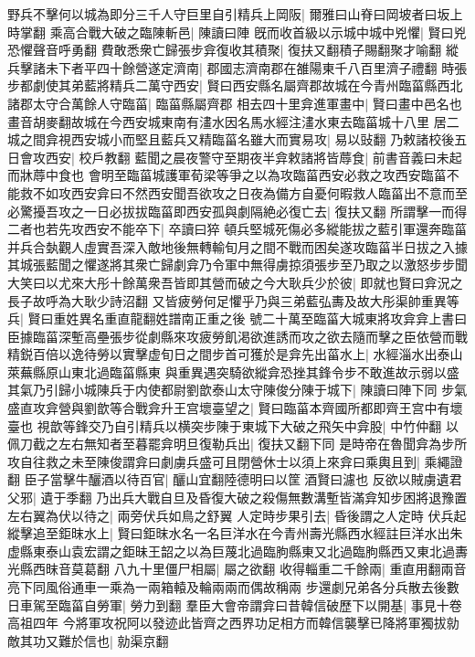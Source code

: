 野兵不擊何以城為即分三千人守巨里自引精兵上岡阪|{
	爾雅曰山脊曰岡坡者曰坂上時掌翻}
乘高合戰大破之臨陳斬邑|{
	陳讀曰陣}
旣而收首級以示城中城中兇懼|{
	賢曰兇恐懼聲音呼勇翻}
費敢悉衆亡歸張步弇復收其積聚|{
	復扶又翻積子賜翻聚才喻翻}
縱兵擊諸未下者平四十餘營遂定濟南|{
	郡國志濟南郡在雒陽東千八百里濟子禮翻}
時張步都劇使其弟藍將精兵二萬守西安|{
	賢曰西安縣名屬齊郡故城在今青州臨菑縣西北}
諸郡太守合萬餘人守臨菑|{
	臨菑縣屬齊郡}
相去四十里弇進軍畫中|{
	賢曰畫中邑名也畫音胡麥翻故城在今西安城東南有澅水因名馬水經注澅水東去臨菑城十八里}
居二城之間弇視西安城小而堅且藍兵又精臨菑名雖大而實易攻|{
	易以䜴翻}
乃敕諸校後五日會攻西安|{
	校戶教翻}
藍聞之晨夜警守至期夜半弇敕諸將皆蓐食|{
	前書音義曰未起而牀蓐中食也}
會明至臨菑城護軍荀梁等爭之以為攻臨菑西安必救之攻西安臨菑不能救不如攻西安弇曰不然西安聞吾欲攻之日夜為備方自憂何暇救人臨菑出不意而至必驚擾吾攻之一日必拔拔臨菑即西安孤與劇隔絶必復亡去|{
	復扶又翻}
所謂擊一而得二者也若先攻西安不能卒下|{
	卒讀曰猝}
頓兵堅城死傷必多縱能拔之藍引軍還奔臨菑并兵合埶觀人虛實吾深入敵地後無轉輸旬月之間不戰而困矣遂攻臨菑半日拔之入據其城張藍聞之懼遂將其衆亡歸劇弇乃令軍中無得虜掠須張步至乃取之以激怒步步聞大笑曰以尤來大彤十餘萬衆吾皆即其營而破之今大耿兵少於彼|{
	即就也賢曰弇況之長子故呼為大耿少詩沼翻}
又皆疲勞何足懼乎乃與三弟藍弘夀及故大彤渠帥重異等兵|{
	賢曰重姓異名重直龍翻姓譜南正重之後}
號二十萬至臨菑大城東將攻弇弇上書曰臣據臨菑深塹高壘張步從劇縣來攻疲勞飢渇欲進誘而攻之欲去隨而擊之臣依營而戰精鋭百倍以逸待勞以實擊虚旬日之間步首可獲於是弇先出菑水上|{
	水經淄水出泰山萊蕪縣原山東北過臨菑縣東}
與重異遇突騎欲縱弇恐挫其鋒令步不敢進故示弱以盛其氣乃引歸小城陳兵于内使都尉劉歆泰山太守陳俊分陳于城下|{
	陳讀曰陣下同}
步氣盛直攻弇營與劉歆等合戰弇升王宫壞臺望之|{
	賢曰臨菑本齊國所都即齊王宫中有壞臺也}
視歆等鋒交乃自引精兵以横突步陳于東城下大破之飛矢中弇股|{
	中竹仲翻}
以佩刀截之左右無知者至暮罷弇明旦復勒兵出|{
	復扶又翻下同}
是時帝在魯聞弇為步所攻自往救之未至陳俊謂弇曰劇虜兵盛可且閉營休士以須上來弇曰乘輿且到|{
	乘繩證翻}
臣子當擊牛釃酒以待百官|{
	釃山宜翻陸德明曰以筐酒賢曰濾也}
反欲以賊虜遺君父邪|{
	遺于季翻}
乃出兵大戰自旦及昏復大破之殺傷無數溝塹皆滿弇知步困將退豫置左右翼為伏以待之|{
	兩旁伏兵如鳥之舒翼}
人定時步果引去|{
	昏後謂之人定時}
伏兵起縱擊追至鉅昩水上|{
	賢曰鉅昩水名一名巨洋水在今青州壽光縣西水經註巨洋水出朱虚縣東泰山袁宏謂之鉅昧王韶之以為巨蔑北過臨朐縣東又北過臨朐縣西又東北過夀光縣西昩音莫葛翻}
八九十里僵尸相屬|{
	屬之欲翻}
收得輜重二千餘兩|{
	重直用翻兩音亮下同風俗通車一乘為一兩箱轅及輪兩兩而偶故稱兩}
步還劇兄弟各分兵散去後數日車駕至臨菑自勞軍|{
	勞力到翻}
羣臣大會帝謂弇曰昔韓信破歷下以開基|{
	事見十卷高祖四年}
今將軍攻祝阿以發迹此皆齊之西界功足相方而韓信襲擊已降將軍獨拔勍敵其功又難於信也|{
	勍渠京翻}
